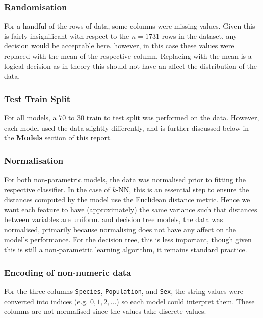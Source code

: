 \documentclass{article}
\begin{document}
\subsubsection{Randomisation}

For a handful of the rows of data, some columns were missing values. Given this is fairly insignificant with respect to the $n=1731$ rows in the dataset, any decision would be acceptable here, however, in this case these values were replaced with the mean of the respective column. Replacing with the mean is a logical decision as in theory this should not have an affect the distribution of the data.

\subsubsection{Test Train Split}

For all models, a $70$ to $30$ train to test split was performed on the data. However, each model used the data slightly differently, and is further discussed below in the \textbf{Models} section of this report.

\subsubsection{Normalisation}

For both non-parametric models, the data was normalised prior to fitting the respective classifier. In the case of $k$-NN, this is an essential step to ensure the distances computed by the model use the Euclidean distance metric. Hence we want each feature to have (approximately) the same variance such that distances between variables are uniform. and decision tree models, the data was normalised, primarily because normalising does not have any affect on the model's performance. For the decision tree, this is less important, though given this is still a non-parametric learning algorithm, it remains standard practice.

\subsubsection{Encoding of non-numeric data}

For the three columns \texttt{Species}, \texttt{Population}, and \texttt{Sex}, the string values were converted into indices (e.g. $0, 1, 2, ...$) so each model could interpret them. These columns are not normalised since the values take discrete values.
\end{document}
